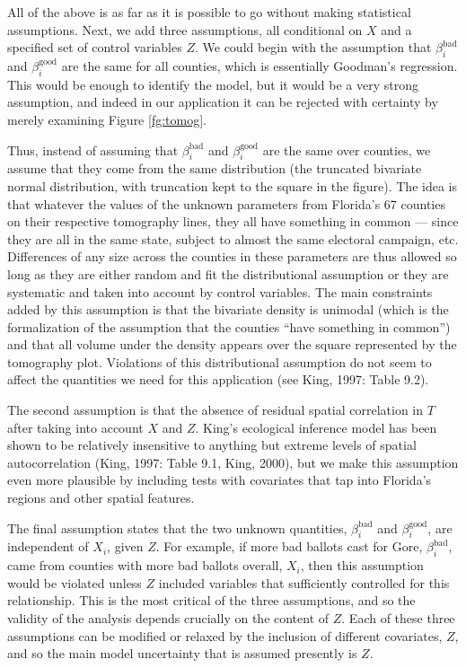 \documentclass[11pt,titlepage]{article}
\newcommand{\bb}{\beta^{\text{bad}}}
\newcommand{\bg}{\beta^{\text{good}}}
\begin{document}
All of the above is as far as it is possible to go without making
statistical assumptions.  Next, we add three assumptions, all
conditional on $X$ and a specified set of control variables $Z$.  We
could begin with the assumption that $\bb_i$ and $\bg_i$ are the same
for all counties, which is essentially Goodman's regression.  This
would be enough to identify the model, but it would be a very strong
assumption, and indeed in our application it can be rejected with
certainty by merely examining Figure \ref{fg:tomog}.

Thus, instead of assuming that $\bb_i$ and $\bg_i$ are the same over
counties, we assume that they come from the same distribution (the
truncated bivariate normal distribution, with truncation kept to the
square in the figure).  The idea is that whatever the values of the
unknown parameters from Florida's 67 counties on their respective
tomography lines, they all have something in common --- since they are
all in the same state, subject to almost the same electoral campaign,
etc.  Differences of any size across the counties in these parameters
are thus allowed so long as they are either random and fit the
distributional assumption or they are systematic and taken into
account by control variables.  The main constraints added by this
assumption is that the bivariate density is unimodal (which is the
formalization of the assumption that the counties ``have something in
common'') and that all volume under the density appears over the
square represented by the tomography plot.  Violations of this
distributional assumption do not seem to affect the quantities we need
for this application (see King, 1997: Table 9.2).

The second assumption is that the absence of residual spatial
correlation in $T$ after taking into account $X$ and $Z$.  King's
ecological inference model has been shown to be relatively insensitive
to anything but extreme levels of spatial autocorrelation (King, 1997:
Table 9.1, King, 2000)\nocite{King00}, but we make this assumption
even more plausible by including tests with covariates that tap into
Florida's regions and other spatial features.

The final assumption states that the two unknown quantities, $\bb_i$
and $\bg_i$, are independent of $X_i$, given $Z$.  For example, if
more bad ballots cast for Gore, $\bb_i$, came from counties with more
bad ballots overall, $X_i$, then this assumption would be violated
unless $Z$ included variables that sufficiently controlled for this
relationship.  This is the most critical of the three assumptions, and
so the validity of the analysis depends crucially on the content of
$Z$.  Each of these three assumptions can be modified or relaxed by
the inclusion of different covariates, $Z$, and so the main model
uncertainty that is assumed presently is $Z$.
\end{document}
